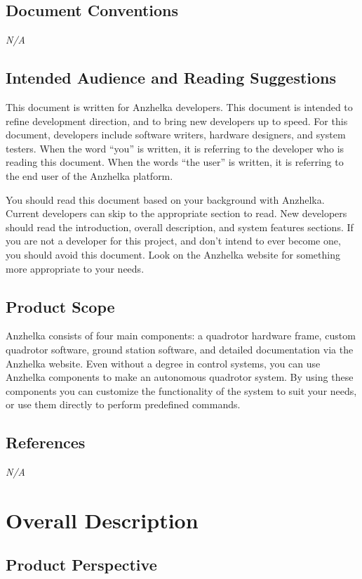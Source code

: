 \documentclass[english]{article}
\numberwithin{equation}{section} %
\begin{document}
\subsection{Document Conventions}
\textit{N/A}
\subsection{Intended Audience and Reading Suggestions}
This document is written for Anzhelka developers. This document is intended to refine development direction, and to bring new developers up to speed. For this document, developers include software writers, hardware designers, and system testers. When the word ``you'' is written, it is referring to the developer who is reading this document. When the words ``the user'' is written, it is referring to the end user of the Anzhelka platform.

You should read this document based on your background with Anzhelka. Current developers can skip to the appropriate section to read. New developers should read the introduction, overall description, and system features sections. If you are not a developer for this project, and don't intend to ever become one, you should avoid this document. Look on the Anzhelka website for something more appropriate to your needs.


\subsection{Product Scope}
Anzhelka consists of four main components: a quadrotor hardware frame, custom quadrotor software, ground station software, and detailed documentation via the Anzhelka website. Even without a degree in control systems, you can use Anzhelka components to make an autonomous quadrotor system. By using these components you can customize the functionality of the system to suit your needs, or use them directly to perform predefined commands.


\subsection{References}
\textit{N/A}

\section{Overall Description}
\subsection{Product Perspective}
\end{document}
